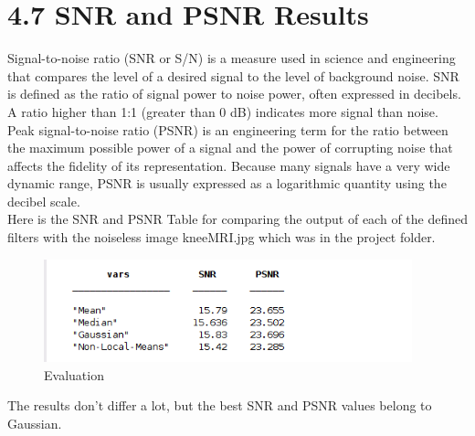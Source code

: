 \documentclass[12pt,fleqn]{article}
\begin{document}
\section{4.7 SNR and PSNR Results}
Signal-to-noise ratio (SNR or S/N) is a measure used in science and engineering that compares the level of a desired signal to the level of background noise. SNR is defined as the ratio of signal power to noise power, often expressed in decibels. A ratio higher than 1:1 (greater than 0 dB) indicates more signal than noise.\\
Peak signal-to-noise ratio (PSNR) is an engineering term for the ratio between the maximum possible power of a signal and the power of corrupting noise that affects the fidelity of its representation. Because many signals have a very wide dynamic range, PSNR is usually expressed as a logarithmic quantity using the decibel scale. \\
Here is the SNR and PSNR Table for comparing the output of each of the defined filters with the noiseless image kneeMRI.jpg which was in the project folder.
\begin{figure}[H]
	\centering
	\includegraphics[width=0.95\textwidth]{snr_psnr.png}
	\caption{Evaluation}
	\label{fig:2.3.3}
\end{figure}
The results don't differ a lot, but the best SNR and PSNR values belong to Gaussian.
\end{document}
